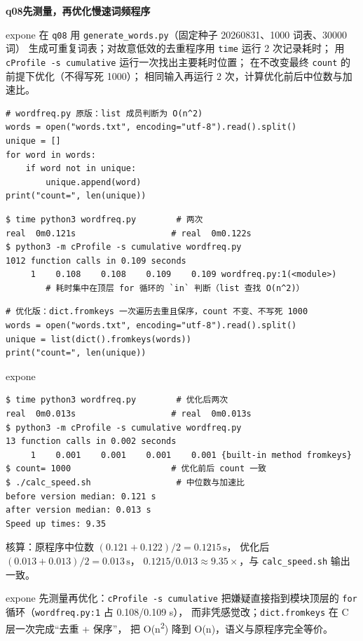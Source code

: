\documentclass[11pt,a4paper,fontset=none]{ctexart}
\newcommand{\hwbanner}[3]{%
  \par\vspace{1.1em}
  \begin{tcolorbox}[enhanced, colback=#1!8, colframe=#1!75!black,
    boxrule=0.8pt, arc=2pt, left=7pt, right=7pt, top=4pt, bottom=4pt,
    before skip=1.1em]
    {\bfseries\color{#1!75!black}#2\qquad #3}
  \end{tcolorbox}
  \par\vspace{0.1em}\noindent\ignorespaces
}
\newcommand{\sublabel}[2]{%
  \par\vspace{0.8em}\noindent{\bfseries\color{#1!75!black}#2}\par\nobreak\vspace{0.25em}\noindent\ignorespaces
}
\begin{document}
\hwbanner{expone}{q08}{先测量，再优化慢速词频程序}
\begin{reqbox}{expone}
  在 \texttt{q08} 用 \texttt{generate\_words.py}（固定种子 20260831、1000 词表、30000 词）
  生成可重复词表；对故意低效的去重程序用 \texttt{time} 运行 2 次记录耗时；
  用 \texttt{cProfile -s cumulative} 运行一次找出主要耗时位置；
  在不改变最终 \texttt{count} 的前提下优化（不得写死 1000）；
  相同输入再运行 2 次，计算优化前后中位数与加速比。
\end{reqbox}
\sublabel{expone}{\faCode\ 原程序与剖析}
\begin{lstlisting}[style=output]
# wordfreq.py 原版：list 成员判断为 O(n^2)
words = open("words.txt", encoding="utf-8").read().split()
unique = []
for word in words:
    if word not in unique:
        unique.append(word)
print("count=", len(unique))
\end{lstlisting}
\begin{lstlisting}[style=output]
$ time python3 wordfreq.py        # 两次
real  0m0.121s                   # real  0m0.122s
$ python3 -m cProfile -s cumulative wordfreq.py
1012 function calls in 0.109 seconds
     1    0.108    0.108    0.109    0.109 wordfreq.py:1(<module>)
        # 耗时集中在顶层 for 循环的 `in` 判断（list 查找 O(n^2)）
\end{lstlisting}
\sublabel{expone}{\faBolt\ 优化}
\begin{lstlisting}[style=output]
# 优化版：dict.fromkeys 一次遍历去重且保序，count 不变、不写死 1000
words = open("words.txt", encoding="utf-8").read().split()
unique = list(dict().fromkeys(words))
print("count=", len(unique))
\end{lstlisting}
\begin{resbox}{expone}
\begin{lstlisting}[style=output]
$ time python3 wordfreq.py        # 优化后两次
real  0m0.013s                   # real  0m0.013s
$ python3 -m cProfile -s cumulative wordfreq.py
13 function calls in 0.002 seconds
     1    0.001    0.001    0.001    0.001 {built-in method fromkeys}
$ count= 1000                    # 优化前后 count 一致
$ ./calc_speed.sh                 # 中位数与加速比
before version median: 0.121 s
after version median: 0.013 s
Speed up times: 9.35
\end{lstlisting}
核算：原程序中位数 $(0.121+0.122)/2=0.1215\,\text{s}$，
优化后 $(0.013+0.013)/2=0.013\,\text{s}$，
$0.1215/0.013\approx 9.35\times$，与 \texttt{calc\_speed.sh} 输出一致。
\end{resbox}
\begin{trapbox}{expone}
  先测量再优化：\texttt{cProfile -s cumulative} 把嫌疑直接指到模块顶层的
  \texttt{for} 循环（\texttt{wordfreq.py:1} 占 0.108/0.109 s），
  而非凭感觉改；\texttt{dict.fromkeys} 在 C 层一次完成“去重 + 保序”，
  把 O(n\textsuperscript{2}) 降到 O(n)，语义与原程序完全等价。
\end{trapbox}
\end{document}
